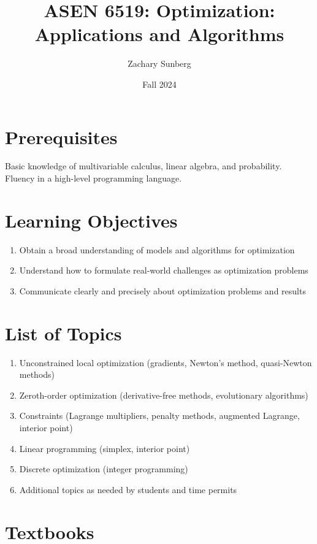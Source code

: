\documentclass[9pt]{article}
\title{ASEN 6519: Optimization: Applications and Algorithms}
\author{Zachary Sunberg}
\date{Fall 2024}
\begin{document}
\maketitle

\section*{Prerequisites}

Basic knowledge of multivariable calculus, linear algebra, and probability. Fluency in a high-level programming language.

\section*{Learning Objectives}

\begin{enumerate}[noitemsep]
    \item Obtain a broad understanding of models and algorithms for optimization
    \item Understand how to formulate real-world challenges as optimization problems
    \item Communicate clearly and precisely about optimization problems and results
\end{enumerate}

\section*{List of Topics}

\begin{enumerate}[noitemsep]
    \item Unconstrained local optimization (gradients, Newton's method, quasi-Newton methods)
    \item Zeroth-order optimization (derivative-free methods, evolutionary algorithms)
    \item Constraints (Lagrange multipliers, penalty methods, augmented Lagrange, interior point)
    \item Linear programming (simplex, interior point)
    \item Discrete optimization (integer programming)
    \item Additional topics as needed by students and time permits
\end{enumerate}

\section*{Textbooks}
\end{document}
